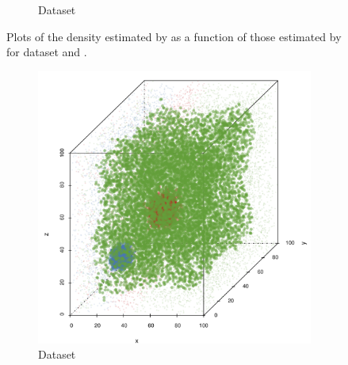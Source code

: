 \begin{figure}
\begin{subfigure}{0.23\textwidth}
			\caption{Dataset \baakmanTwo}
			\label{fig:discussion:multisphere:mbevssambe:baakman2}
		\end{subfigure}	
		\caption{Plots of the density estimated by \sambe as a function of those estimated by \mbe for dataset %
			\ferdosiTwo and %
			\baakmanTwo.
		}
		\label{fig:discussion:multisphere:two:mbevssambe}
	\end{figure}

	\begin{figure}
		\centering
		\begin{subfigure}{0.23\textwidth}
			\centering
			\includegraphics[keepaspectratio=true, width=\textwidth, height=0.23\textheight]{discussion/img/ferdosi_2_abs_error_mbeSmallerThansambe}
			\caption{Dataset \ferdosiTwo}
			\label{fig:discussion:multisphere:mbeLowerError:ferdosi2}
		\end{subfigure}
		\begin{subfigure}{0.23\textwidth}
			\centering

\end{subfigure}
\end{figure}
